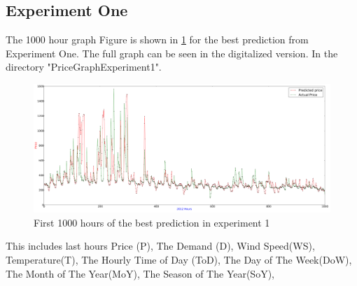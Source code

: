 \subsection{Experiment One}
The 1000 hour graph Figure is shown in \ref{fig:fullPageExperiment1} for the best prediction from Experiment One. The full graph can be seen in the digitalized version. In the directory "PriceGraphExperiment1".

\begin{figure}
\centering
\includegraphics[width=\linewidth]{billeder/PriceGraphs/Experiment1.png}
\caption{First 1000 hours of the best prediction in experiment 1}
\label{fig:fullPageExperiment1}
\end{figure}

This includes last hours Price (P), The Demand (D), Wind Speed(WS), Temperature(T), The Hourly Time of Day (ToD), The Day of The Week(DoW), The Month of The Year(MoY), The Season of The Year(SoY),

